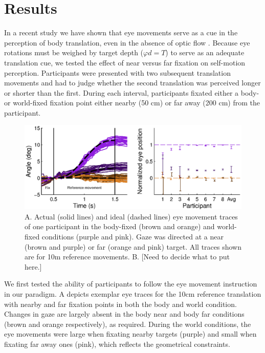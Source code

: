 \section{Results}

In a recent study we have shown that eye movements serve as a cue in the perception of body translation, even in the absence of optic flow \cite{clemens2015a}. Because eye rotations must be weighed by target depth ($\varphi d = T$) to serve as an adequate translation cue, we tested the effect of near versus far fixation on self-motion perception. Participants were presented with two subsequent translation movements  and had to judge whether the second translation was perceived longer or shorter than the first. During each interval, participants fixated either a body- or world-fixed fixation point either nearby (50 cm) or far away (200 cm) from the participant.

\begin{figure}
    \includegraphics[width=1.0\textwidth]{src/paper4/paper4_figure2.eps}

    \caption{A. Actual (solid lines) and ideal (dashed lines) eye movement traces of one participant in the body-fixed (brown and orange) and world-fixed conditions (purple and pink). Gaze was directed at a near (brown and purple) or far (orange and pink) target. All traces shown are for 10m reference movements. B. [Need to decide what to put here.]}
    \label{p4:fig2}
\end{figure}

We first tested the ability of participants to follow the eye movement instruction in our paradigm. A depicts exemplar eye traces for the 10cm reference translation with nearby and far fixation points in both the body and world condition. Changes in gaze are largely absent in the body near and body far conditions (brown and orange respectively), as required. During the world conditions, the eye movements were large when fixating nearby targets (purple) and small when fixating far away ones (pink), which reflects the geometrical constraints. 

